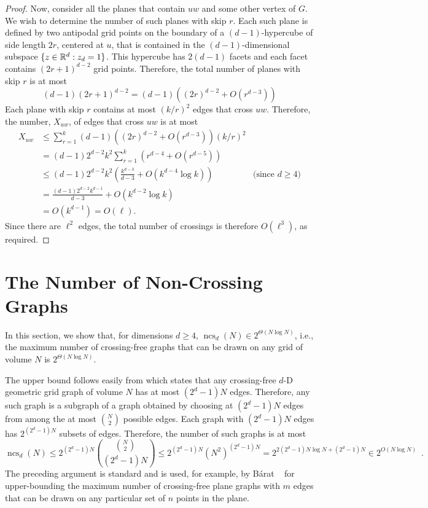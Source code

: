\documentclass[12pt]{article}
\newcommand{\n}{N}
\DeclareMathOperator{\ncs}{ncs}
\begin{document}
\begin{proof}
  Now, consider all the planes that contain $uw$ and some other vertex
  of $G$.  We wish to determine the number of such planes with skip $r$.
  Each such plane is defined by two antipodal grid points on the boundary
  of a $(d-1)$-hypercube of side length $2r$, centered at $u$, that is
  contained in the $(d-1)$-dimensional subspace $\{z\in\mathbb{R}^d:z_d=1\}$.
  This hypercube has $2(d-1)$ facets and each facet contains
  $(2r+1)^{d-2}$ grid points.  Therefore, the total number of planes with
  skip $r$ is at most
  \[
     (d-1)(2r+1)^{d-2} = (d-1)\left((2r)^{d-2} + O(r^{d-3})\right)
  \]
  Each plane with skip $r$ contains at most $(k/r)^2$ edges that cross
  $uw$.  Therefore, the number, $X_{uw}$, of edges that cross $uw$
  is at most
  \begin{align*}
     X_{uw} & \le \sum_{r=1}^k(d-1)\left((2r)^{d-2}+O(r^{d-3})\right)(k/r)^2 \\
         & = (d-1)2^{d-2}k^2\sum_{r=1}^k\left(r^{d-4} + O(r^{d-5})\right) \\
         & \le (d-1)2^{d-2}k^2\left(\frac{k^{d-3}}{d-3} 
             + O\left(k^{d-4}\log k\right)\right) 
               & \text{(since $d\ge 4$)} \\
         & = \frac{(d-1)2^{d-2}k^{d-1}}{d-3} + O(k^{d-2}\log k) \\
         & = O(k^{d-1}) = O(\ell).
  \end{align*}
  Since there are $\ell^2$ edges, the total number of crossings is
  therefore $O(\ell^3)$, as required.
\end{proof}

\section{The Number of Non-Crossing Graphs}

In this section, we show that, for dimensions $d\ge 4$, $\ncs_d(\n)\in
2^{\Theta(\n\log\n)}$, i.e., the maximum number of crossing-free graphs
that can be drawn on any grid of volume $\n$ is $2^{\Theta(\n\log\n)}$.

The upper bound follows easily from  which states that
any crossing-free $d$-D geometric grid graph of volume $\n$ has at
most $(2^d-1)\n$ edges.  Therefore, any such graph is a subgraph of a
graph obtained by choosing at $(2^d-1)\n$ edges from among the at most
$\binom{\n}{2}$ possible edges.  Each graph with $(2^d-1)\n$ edges has
$2^{(2^d-1)\n}$ subsets of edges.  Therefore, the number of such graphs
is at most
\[
  \ncs_d(\n) \le 2^{(2^d-1)\n}\binom{\binom{\n}{2}}{(2^d-1)\n} 
      \le 2^{(2^d-1)\n} (\n^{2})^{(2^d-1)\n} 
      = 2^{2(2^d-1)\n\log\n+(2^d-1)\n} 
      \in 2^{O(\n\log\n)} \enspace .
\]
The preceding argument is standard and is used, for example, by B\'arat
\etal~\cite[Lemma~4]{barat.matousek.ea:bounded-degree} for upper-bounding
the maximum number of crossing-free plane graphs with $m$ edges that can
be drawn on any particular set of $n$ points in the plane.
\end{document}
